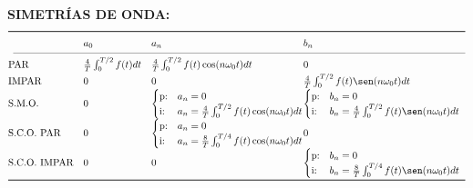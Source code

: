 \documentclass[letter,twoside,8pt]{article}
\begin{document}
\textbf{SIMETRÍAS DE ONDA:}
\begin{equation*}
\def\arraystretch{1.4}
\begin{array}{@{}lll@{}lll@{}lll@{}}
\toprule
 & a_0 & a_n & b_n\\
\cmidrule(l){1-4}
\text{PAR} & \frac{4}{T}\int_0^{T/2}f(t){dt}
    & \frac{4}{T}\int_0^{T/2}f(t)\cos(n{\omega_0}t){dt}
    & 0\\
\text{IMPAR} & 0
    & 0
    & \frac{4}{T}\int_0^{T/2}f(t)\sen(n{\omega_0}t){dt}\\
\text{S.M.O.} & 0
    & \begin{cases}
        \text{p:}&a_n=0\\
        \text{i:}&a_n=\frac{4}{T}\int_0^{T/2}f(t)\cos(n{\omega_0}t){dt}\\
    \end{cases}
    & \begin{cases}
        \text{p:}&b_n=0\\
        \text{i:}&b_n=\frac{4}{T}\int_0^{T/2}f(t)\sen(n{\omega_0}t){dt}\\
    \end{cases}\\
\text{S.C.O. PAR} & 0
    & \begin{cases}
        \text{p:}&a_n=0\\
        \text{i:}&a_n=\frac{8}{T}\int_0^{T/4}f(t)\cos(n{\omega_0}t){dt}\\
    \end{cases}
    & 0\\
\text{S.C.O. IMPAR} & 0
    & 0
    & \begin{cases}
        \text{p:}&b_n=0\\
        \text{i:}&b_n=\frac{8}{T}\int_0^{T/4}f(t)\sen(n{\omega_0}t){dt}\\
    \end{cases}\\
\bottomrule
\end{array}
\end{equation*}
\end{document}
